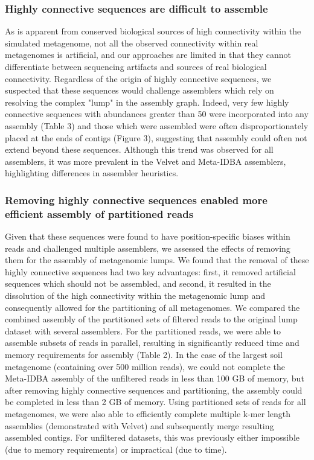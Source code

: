 \documentclass[10pt]{article}
\begin{document}
\subsubsection*{Highly connective sequences are difficult to assemble}
As is apparent from conserved biological sources of high connectivity within the simulated metagenome, not all the observed connectivity within real metagenomes is artificial, and our approaches are limited in that they cannot differentiate between sequencing artifacts and sources of real biological connectivity.  Regardless of the origin of highly connective sequences, we suspected that these sequences would challenge assemblers which rely on resolving the complex "lump" in the assembly graph.  Indeed, very few highly connective sequences with abundances greater than 50 were incorporated into any assembly (Table 3) and those which were assembled were often disproportionately placed at the ends of contigs (Figure 3), suggesting that assembly could often not extend beyond these sequences.  Although this trend was observed for all assemblers, it was more prevalent in the Velvet and Meta-IDBA assemblers, highlighting differences in assembler heuristics.  

\subsubsection*{Removing highly connective sequences enabled more efficient assembly of partitioned reads}
Given that these sequences were found to have position-specific biases within reads and challenged multiple assemblers, we assessed the effects of removing them for the assembly of metagenomic lumps.  We found that the removal of these highly connective sequences had two key advantages:  first, it removed artificial sequences which should not be assembled, and second, it resulted in the dissolution of the high connectivity within the metagenomic lump and consequently allowed for the partitioning of all metagenomes.  We compared the combined assembly of the partitioned sets of filtered reads to the original lump dataset with several assemblers.  For the partitioned reads, we were able to assemble subsets of reads in parallel, resulting in significantly reduced time and memory requirements for assembly (Table 2).  In the case of the largest soil metagenome (containing over 500 million reads), we could not complete the Meta-IDBA assembly of the unfiltered reads in less than 100 GB of memory, but after removing highly connective sequences and partitioning, the assembly could be completed in less than 2 GB of memory.  Using partitioned sets of reads for all metagenomes, we were also able to efficiently complete multiple k-mer length assemblies (demonstrated with Velvet) and subsequently merge resulting assembled contigs.  For unfiltered datasets, this was previously either impossible (due to memory requirements) or impractical (due to time).   
\end{document}
